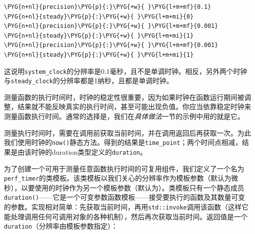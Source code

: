 
\begin{codeblockbg}
\begin{Verbatim}[commandchars=\\\{\},breaklines=true,breakanywhere=true,fontsize=\codefont,xleftmargin=17bp]
\PYG{n+nl}{precision}\PYG{p}{:}\PYG{+w}{ }\PYG{l+m+mf}{0.1}
\PYG{n+nl}{steady}\PYG{p}{:}\PYG{+w}{ }\PYG{l+m+mi}{0}
\PYG{n+nl}{precision}\PYG{p}{:}\PYG{+w}{ }\PYG{l+m+mf}{0.001}
\PYG{n+nl}{steady}\PYG{p}{:}\PYG{+w}{ }\PYG{l+m+mi}{1}
\PYG{n+nl}{precision}\PYG{p}{:}\PYG{+w}{ }\PYG{l+m+mf}{0.001}
\PYG{n+nl}{steady}\PYG{p}{:}\PYG{+w}{ }\PYG{l+m+mi}{1}
\end{Verbatim}
\end{codeblockbg}



这说明\texttt{system\_\allowbreak{}clock}的分辨率是0.1毫秒，且不是单调时钟。相反，另外两个时钟与\texttt{steady\_\allowbreak{}clock}的分辨率都是1纳秒，且都是单调时钟。



测量函数的执行时间时，时钟的稳定性很重要，因为如果时钟在函数运行期间被调整，结果就不能反映真实的执行时间，甚至可能出现负值。你应当依靠稳定时钟来测量函数执行时间。通常的选择是，我们在\textit{具体做法}一节的示例中用的就是它。



测量执行时间时，需要在调用前获取当前时间，并在调用返回后再获取一次。为此我们使用时钟的\texttt{now()}静态方法。得到的结果是\texttt{time\_\allowbreak{}point}；两个时间点相减，结果是由该时钟的duration类型定义的\texttt{duration}。



为了创建一个可用于测量任意函数执行时间的可复用组件，我们定义了一个名为\texttt{perf\_\allowbreak{}timer}的类模板。该类模板以我们关心的分辨率作为模板参数（默认为微秒），以要使用的时钟作为另一个模板参数（默认为）。类模板只有一个静态成员\texttt{duration()}——它是一个可变参数函数模板——接受要执行的函数及其数量可变的参数。实现相对简单：先获取当前时间，再用\texttt{std::\allowbreak{}invoke}调用该函数（这样它能处理调用任何可调用对象的各种机制），然后再次获取当前时间。返回值是一个\texttt{duration}（分辨率由模板参数指定）：



